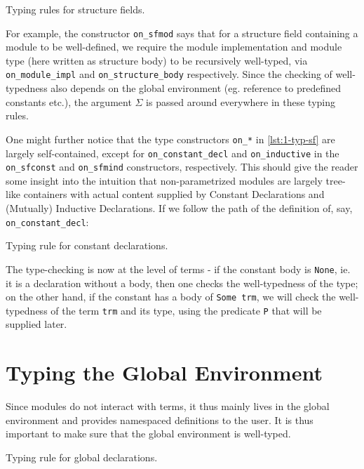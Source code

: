 \begin{listing}[H]
  \caption{Typing rules for structure fields.}
  \label{lst:1-typ-sf}
\end{listing}

For example, the constructor \verb|on_sfmod| says that for a structure field
containing a module to be well-defined, we require the module implementation and
module type (here written as structure body) to be recursively well-typed, via
\verb|on_module_impl| and \verb|on_structure_body| respectively. Since the
checking of well-typedness also depends on the global environment (eg. reference
to predefined constants etc.), the argument $\Sigma$ is passed around everywhere
in these typing rules.

One might further notice that the type constructors \verb|on_*| in
\ref{lst:1-typ-sf} are largely self-contained, except for
\verb|on_constant_decl| and \verb|on_inductive| in the \verb|on_sfconst| and
\verb|on_sfmind| constructors, respectively. This should give the reader some
insight into the intuition that non-parametrized modules are largely tree-like
containers with actual content supplied by Constant Declarations and (Mutually)
Inductive Declarations. If we follow the path of the definition of, say,
\verb|on_constant_decl|:

\begin{listing}[H]
  \caption{Typing rule for constant declarations.}
  \label{lst:1-typ-cst}
\end{listing}

The type-checking is now at the level of terms - if the constant body is
\verb|None|, ie. it is a declaration without a body, then one checks the
well-typedness of the type; on the other hand, if the constant has a body of
\verb|Some trm|, we will check the well-typedness of the term \verb|trm| and its
type, using the predicate \verb|P| that will be supplied later.

\section{Typing the Global Environment}
Since modules do not interact with terms, it thus mainly lives in the global
environment and provides namespaced definitions to the user. It is thus
important to make sure that the global environment is well-typed.

\begin{listing}[H]
  \caption{Typing rule for global declarations.}
  \label{lst:1-typ-gd}
\end{listing}

